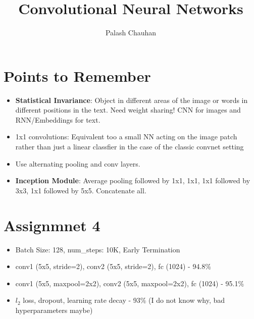 \documentclass{article}
\begin{document}
\title{Convolutional Neural Networks}
\author{Palash Chauhan}

\maketitle

\section{Points to Remember}
\begin{itemize}
	\item \textbf{Statistical Invariance}: Object in different areas of the image or words in different positions in the text. Need weight sharing! CNN for images and RNN/Embeddings for text.
	\item 1x1 convolutions: Equivalent too a small NN acting on the image patch rather than just a linear classfier in the case of the classic convnet setting
	\item Use alternating pooling and conv layers.
	\item \textbf{Inception Module}: Average pooling followed by 1x1, 1x1, 1x1 followed by 3x3, 1x1 followed by 5x5. Concatenate all. 
\end{itemize}

\section{Assignmnet 4}
\begin{itemize}
	\item Batch Size: 128, num\_steps: 10K, Early Termination
	\item conv1 (5x5, stride=2), conv2 (5x5, stride=2), fc (1024) - 94.8\%
	\item conv1 (5x5, maxpool=2x2), conv2 (5x5, maxpool=2x2), fc (1024) - 95.1\%
	\item $l_2$ loss, dropout, learning rate decay - 93\% (I do not know why, bad hyperparameters maybe)
\end{itemize}
\end{document}
